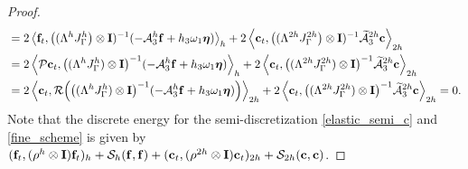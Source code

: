 \begin{proof}
\begin{align*}
	& = 2\left<{\bf f}_t,\big(({\Lambda}^{h}{J}^h_\Gamma\big)\otimes {\bf I})^{-1}(-\mathcal{A}_3^h{\bf f}+h_3\omega_1{\bm \eta})\right>_{h}+ 2\left<{\bf c}_t,\big(({\Lambda}^{2h}{J}^{2h}_\Gamma\big)\otimes{\bf I})^{-1}\wt{\mathcal{A}}_3^{2h}{\bf c}\right>_{2h}\\%
	& = 2\left<{\mathcal{P}}{\bf c}_t,\big(({\Lambda}^{h}{J}^h_\Gamma)\otimes{\bf I}\big)^{-1}(-\mathcal{A}_3^h{\bf f}+h_3\omega_1{\bm \eta})\right>_{h}+ 2\left<{\bf c}_t, \big(({\Lambda}^{2h}{J}^{2h}_\Gamma)\otimes{\bf I}\big)^{-1}\wt{\mathcal{A}}_3^{2h}{\bf c}\right>_{2h}\\%
	& = 2\left<{\bf c}_t,{\mathcal{R}}\Big(\big(({\Lambda}^{h}{J}^h_\Gamma)\otimes{\bf I}\big)^{-1}(-\mathcal{A}_3^h{\bf f}+h_3\omega_1{\bm \eta})\Big)\right>_{2h}+ 2\left<{\bf c}_t,\big(({\Lambda}^{2h}{J}^{2h}_\Gamma)\otimes{\bf I}\big)^{-1}\wt{\mathcal{A}}_3^{2h}{\bf c}\right>_{2h} = 0.
	\end{align*}
Note that the discrete energy for the semi-discretization \eqref{elastic_semi_c} and \eqref{fine_scheme} is given by $({\bf f}_t,(\rho^h\otimes {\bf I}) {\bf f}_t)_{h} + \mathcal{S}_{h}({\bf f},{\bf f}) + ({\bf c}_t,(\rho^{2h} \otimes {\bf I}){\bf c}_t)_{2h} + \mathcal{S}_{2h}({\bf c},{\bf c})$.
\end{proof}








 